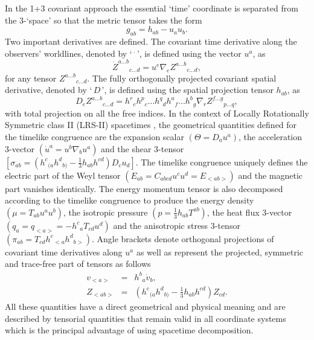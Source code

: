 \documentclass[abstract=on,notitlepage,superscriptaddress,nofootinbib,aps,showpacs,twocolumn,prd]{revtex4}
\newcommand{\0}{^{(0)}}
\newcommand{\1}{^{(1)}}
\newcommand{\2}{^{(2)}}
\newcommand{\3}{{}^{(3)}}
\begin{document}
In the 1+3 covariant approach the essential `time' coordinate is separated from the 3-`space' so that the metric tensor takes the form
\begin{equation}
g_{ab}=h_{ab}-u_au_b. \label{1+3}
\end{equation}
Two important derivatives are defined. The covariant time derivative along the observers' worldlines, denoted by `\,${^{\cdot}}$\,', is defined using the vector ${u^{a}}$, as
\begin{equation} 
\dot{Z}^{a ... b}{}_{c ... d} = u^{e}\nabla_{e} Z^{a ... b}{}_{c ... d},
\end{equation} 
for any tensor ${Z^{a...b}{}_{c...d}}$. The fully orthogonally projected covariant spatial derivative, denoted by `\,${D}$\,', is defined using the spatial projection tensor ${h_{ab}}$, as
\begin{equation}
D_{e} Z^{a...b}{}_{c...d} = h^r{}_{e} h^p{}_{c}... h^q{}_{d} h^a{}_{f}... h^b{}_{g}\nabla_{r} Z^{f...g}{}_{p...q},
\end{equation}
with total projection on all the free indices. 
In the context of Locally Rotationally Symmetric class II (LRS-II) spacetimes \cite{vanElstEllis}, the geometrical quantities defined for the timelike congruence are the expansion scalar $(\Theta = D_{a} u^{a} )$, the acceleration 3-vector $(\dot{u}^a = u^{b}\nabla_{b}u^a )$ and the shear 3-tensor $[\sigma_{ab} =  \left(h^{c}{}_{(a} h^{d}{}_{b)} - \frac{1}{3}h_{ab} h^{cd}\right)D_{c} u_{d}]$. The timelike congruence uniquely defines the electric part of the Weyl tensor $(E_{ab} = C_{abcd} u^{c} u^{d} = E_{<ab>})$ and the magnetic part vanishes identically. The energy momentum tensor is also decomposed according to the timelike congruence to produce the energy density $(\mu = T_{ab} u^{a} u^{b})$, the isotropic pressure $(p = \frac{1}{3} h_{ab} T^{ab})$, the heat flux 3-vector $(q_a = q_{<a>} = - h^{c}{}_{a} T_{cd} u^{d})$ and the anisotropic stress 3-tensor $(\pi_{ab} = T_{cd} h^c{}_{<a} h^d{}_{b>})$. Angle brackets denote orthogonal projections of covariant time derivatives along ${u^{a}}$ as well as represent the projected, symmetric and trace-free part of tensors as follows
\begin{eqnarray}
v_{<a>} &=& h^{b}{}_{a}\dot{v}_{b},  \nonumber\\
Z_{<ab>} &=& \left(h^{c}{}_{(a} h^{d}{}_{b)} - \frac{1}{3}h_{ab} h^{cd}\right) Z_{cd}.
\end{eqnarray} 
All these quantities have a direct geometrical and physical meaning and are described by tensorial quantities that remain valid in all coordinate systems which is the principal advantage of using spacetime decomposition. 
\end{document}
